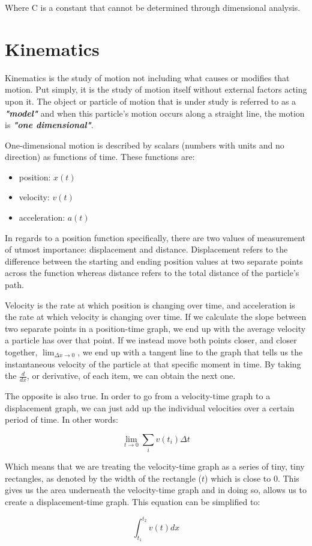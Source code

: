 \documentclass[12pt, letterpaper]{article}
\begin{document}
\noindent
Where C is a constant that cannot be determined through dimensional analysis.

\section{Kinematics}

Kinematics is the study of motion not including what causes or modifies that motion. Put simply, it is the study
of motion itself without external factors acting upon it. The object or particle of motion that is under study
is referred to as a \textit{\textbf{"model"}} and when this particle's motion occurs along a straight line, the motion is
\textit{\textbf{"one dimensional"}}.

One-dimensional motion is described by scalars (numbers with units and no direction) as functions of time. These
functions are:

\begin{itemize}
	\item position: $x(t)$
	\item velocity: $v(t)$
	\item acceleration: $a(t)$
\end{itemize}

\noindent
In regards to a position function specifically, there are two values of measurement of utmost importance:
displacement and distance. Displacement refers to the difference between the starting and ending position
values at two separate points across the function whereas distance refers to the total distance of the
particle's path.

Velocity is the rate at which position is changing over time, and acceleration is the rate at which velocity
is changing over time. If we calculate the slope between two separate points in a position-time graph,
we end up with the average velocity a particle has over that point. If we instead move both points closer,
and closer together, $\lim_{\Delta x\to0}$, we end up with a tangent line to the graph that tells us the instantaneous
velocity of the particle at that specific moment in time. By taking the $\frac{d}{dx}$, or derivative, of each item, 
we can obtain the next one.

\medskip

The opposite is also true. In order to go from a velocity-time graph to a displacement
graph, we can just add up the individual velocities over a certain period of time.
In other words:

$$ \lim_{t\to0} \sum_iv(t_i)\Delta t $$

Which means that we are treating the velocity-time graph as a series of tiny, tiny
rectangles, as denoted by the width of the rectangle ($t$) which is close to 0.
This gives us the area underneath the velocity-time graph and in doing so, allows
us to create a displacement-time graph. This equation can be simplified to:

\large $$\int_{t_1}^{t_2}v(t)dx$$ \normalsize
\end{document}

